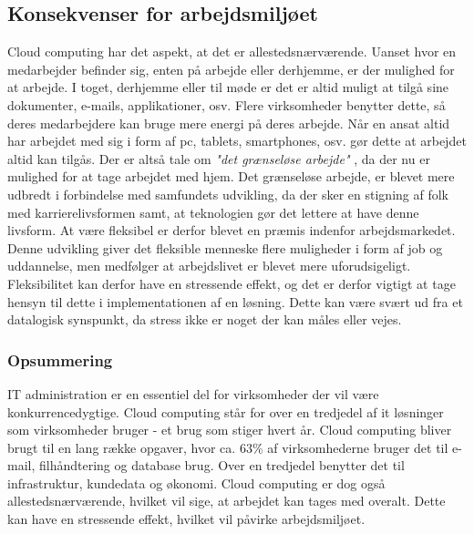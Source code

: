 \subsection{Konsekvenser for arbejdsmiljøet}
Cloud computing har det aspekt, at det er allestedsnærværende. Uanset hvor en medarbejder befinder sig, enten på arbejde eller derhjemme, er der mulighed for at arbejde. I toget, derhjemme eller til møde er det er altid muligt at tilgå sine dokumenter, e-mails, applikationer, osv. Flere virksomheder benytter dette, så deres medarbejdere kan bruge mere energi på deres arbejde. Når en ansat altid har arbejdet med sig i form af pc, tablets, smartphones, osv. gør dette at arbejdet altid kan tilgås. Der er altså tale om \textit{"det grænseløse arbejde"} \citep{SystimeStress}, da der nu er mulighed for at tage arbejdet med hjem. Det grænseløse arbejde, er blevet mere udbredt i forbindelse med samfundets udvikling, da der sker en stigning af folk med karrierelivsformen samt, at teknologien gør det lettere at have denne livsform. At være fleksibel er derfor blevet en præmis indenfor arbejdsmarkedet. Denne udvikling giver det fleksible menneske flere muligheder i form af job og uddannelse, men medfølger at arbejdslivet er blevet mere uforudsigeligt. Fleksibilitet kan derfor have en stressende effekt, og det er derfor vigtigt at tage hensyn til dette i implementationen af en løsning. Dette kan være svært ud fra et datalogisk synspunkt, da stress ikke er noget der kan måles eller vejes. \citep{SystimeStress}

\subsubsection{Opsummering}
IT administration er en essentiel del for virksomheder der vil være konkurrencedygtige. Cloud computing står for over en tredjedel af it løsninger som virksomheder bruger - et brug som stiger hvert år. Cloud computing bliver brugt til en lang række opgaver, hvor ca. 63\% af virksomhederne bruger det til e-mail, filhåndtering og database brug. Over en tredjedel benytter det til infrastruktur, kundedata og økonomi. Cloud computing er dog også allestedsnærværende, hvilket vil sige, at arbejdet kan tages med overalt. Dette kan have en stressende effekt, hvilket vil påvirke arbejdsmiljøet.




